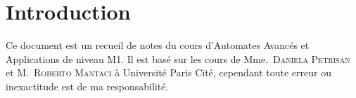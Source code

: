 \section{Introduction}

Ce document est un recueil de notes du cours d'Automates Avancés et Applications de niveau M1. Il est
basé sur les cours de Mme.~\textsc{Daniela Petrisan} et M.~\textsc{Roberto Mantaci} à Université Paris Cité, cependant toute
erreur ou inexactitude est de ma responsabilité.


